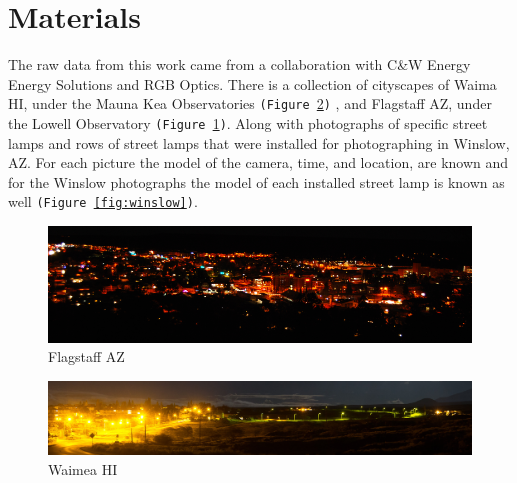 \documentclass[11pt,twocolumn]{article} %
\def\cw{C\&W Energy Energy Solutions\xspace}
\def\rgb{RGB Optics\xspace}
\begin{document}
\section{Materials}

The raw data from this work came from a collaboration with \cw and \rgb. There is a collection of cityscapes of Waima HI, under the Mauna Kea Observatories \texttt{(Figure~\ref{fig:wiama})}
, and Flagstaff AZ,  under the Lowell Observatory \texttt{(Figure~\ref{fig:flagstaff})}. Along with photographs of specific street lamps and rows of street lamps that were installed for photographing in Winslow, AZ. For each picture the model of the camera, time, and location, are known and for the Winslow photographs the model of each installed street lamp is known as well \texttt{(Figure~\ref{fig:winslow})}.

\begin{figure}
        \includegraphics[width=\columnwidth]{./images/flagstaff.png}
        \caption{Flagstaff AZ}
        \label{fig:flagstaff}
\end{figure}

\begin{figure}
        \includegraphics[width=\columnwidth]{./images/wiama.png}
        \caption{Waimea HI}
        \label{fig:wiama}
\end{figure}
\end{document}
